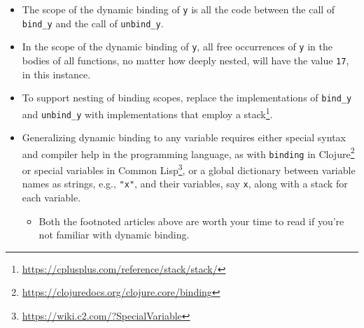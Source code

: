\documentclass[10pt,oneside,x11names]{article}
\begin{document}
\begin{itemize}
\item The scope of the dynamic binding of \texttt{y} is all the code between
the call of \texttt{bind\_y} and the call of \texttt{unbind\_y}.

\item In the scope of the dynamic binding of \texttt{y}, all free occurrences
of \texttt{y} in the bodies of all functions, no matter how deeply
nested, will have the value \texttt{17}, in this instance.

\item To support nesting of binding scopes, replace the
implementations of \texttt{bind\_y} and \texttt{unbind\_y} with implementations
that employ a stack\footnote{\url{https://cplusplus.com/reference/stack/stack/}}.

\item Generalizing dynamic binding to any variable requires either
special syntax and compiler help in the programming language, as
with \texttt{binding} in
Clojure\footnote{\url{https://clojuredocs.org/clojure.core/binding}} or special
variables in Common Lisp\footnote{\url{https://wiki.c2.com/?SpecialVariable}},
or a global dictionary between variable names as strings, e.g.,
\texttt{"x"}, and their variables, say \texttt{x}, along with a stack for each
variable.

\begin{itemize}
\item Both the footnoted articles above are worth your time to read
if you're not familiar with dynamic binding.
\end{itemize}
\end{itemize}
\end{document}
